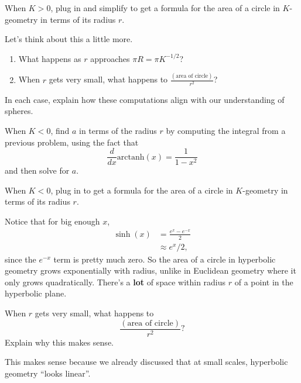 \documentclass[newpage,hints,12pt,noauthor,nooutcomes,handout]{ximera}
\begin{document}
\begin{problem}
  When $K>0$, plug in and simplify to get a formula for the area of a circle in
  $K$-geometry in terms of its radius $r$.
\end{problem}

\begin{problem}
  Let's think about this a little more.
  \begin{enumerate}
  \item What happens as $r$ approaches $\pi R=\pi K^{-1/2}$?
  \item When $r$ gets very small, what happens to $\frac{(\text{area of circle})}{r^2}$?
  \end{enumerate}
  In each case, explain how these computations align with our understanding of spheres.
\end{problem}

\begin{problem}
  When $K<0$, find $a$ in terms of the radius $r$ by computing the
  integral from a previous problem, using the fact that
  \[
  \frac{d}{dx}\mathrm{arctanh}(x)=\frac{1}{1-x^2}
  \]
  and then solve for $a$.

\end{problem}

\begin{problem}
  When $K<0$, plug in to get a formula for the area of a circle in $K$-geometry
  in terms of its radius $r$.
\end{problem}

Notice that for big enough $x$,
\begin{align*}
\sinh(x) &= \frac{e^x-e^{-x}}{2}\\
&\approx e^x/2,
\end{align*}
since the $e^{-x}$ term is pretty much zero.  So the area of a circle
in hyperbolic geometry grows exponentially with radius, unlike in
Euclidean geometry where it only grows quadratically.  There's a
\textbf{lot} of space within radius $r$ of a point in the hyperbolic
plane.


\begin{problem}
  When $r$ gets very small, what happens to
  \[
  \frac{(\text{area of circle})}{r^2}?
  \]
  Explain why this makes sense.
  \begin{freeResponse}
    This makes sense because we already discussed that at small scales,
    hyperbolic geometry ``looks linear''.
  \end{freeResponse}
\end{problem}
\end{document}
